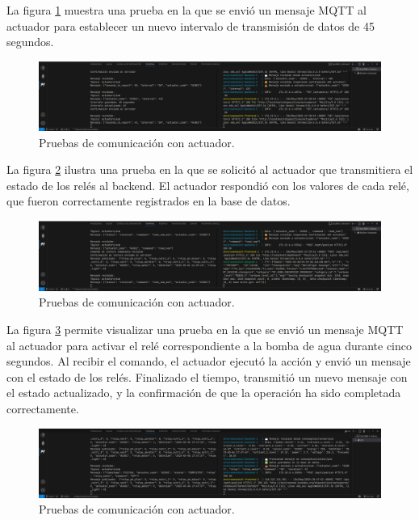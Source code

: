 La figura \ref{fig:prueba_mqtt_actuador_1} muestra una prueba en la que se
envió un mensaje MQTT al actuador para establecer un nuevo intervalo de
transmisión de datos de 45 segundos.

\begin{figure}[H]
    \centering
    \includegraphics[width=\textwidth]{Images/58_prueba_mqtt_actuador_1.png}
    \caption[Pruebas de comunicación con actuador]{Pruebas de comunicación con actuador.}
    \label{fig:prueba_mqtt_actuador_1}
\end{figure}

La figura \ref{fig:prueba_mqtt_actuador_2} ilustra una prueba en la que se
solicitó al actuador que transmitiera el estado de los relés al backend. El
actuador respondió con los valores de cada relé, que fueron correctamente
registrados en la base de datos.

\begin{figure}[H]
    \centering
    \includegraphics[width=\textwidth]{Images/58_prueba_mqtt_actuador_2.png}
    \caption[Pruebas de comunicación con actuador]{Pruebas de comunicación con actuador.}
    \label{fig:prueba_mqtt_actuador_2}
\end{figure}

La figura \ref{fig:prueba_mqtt_actuador_3} permite visualizar una prueba en la
que se envió un mensaje MQTT al actuador para activar el relé correspondiente a
la bomba de agua durante cinco segundos. Al recibir el comando, el actuador
ejecutó la acción y envió un mensaje con el estado de los relés. Finalizado el
tiempo, transmitió un nuevo mensaje con el estado actualizado, y la
confirmación de que la operación ha sido completada correctamente.

\begin{figure}[H]
    \centering
    \includegraphics[width=\textwidth]{Images/58_prueba_mqtt_actuador_3.png}
    \caption[Pruebas de comunicación con actuador]{Pruebas de comunicación con actuador.}
    \label{fig:prueba_mqtt_actuador_3}
\end{figure}

